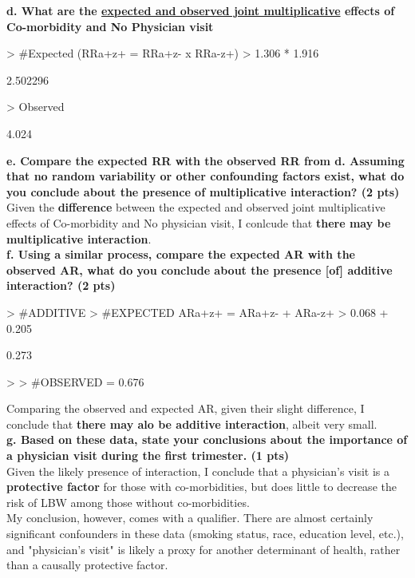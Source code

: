 \documentclass[12pt]{article}
\begin{document}
\noindent \textbf{d. What are the \underline{expected and observed joint multiplicative} effects of Co-morbidity and No Physician visit}

\begin{Schunk}
\begin{Sinput}
> #Expected (RRa+z+ = RRa+z- x RRa-z+)
> 1.306 * 1.916
\end{Sinput}
\begin{Soutput}
[1] 2.502296
\end{Soutput}
\begin{Sinput}
> Observed
\end{Sinput}
\begin{Soutput}
[1] 4.024
\end{Soutput}
\end{Schunk}

\noindent \textbf{e. Compare the expected RR with the observed RR from d.  Assuming that no random variability or other confounding factors exist, what do you conclude about the presence of multiplicative interaction? (2 pts)} \\

Given the \textbf{difference} between the expected and observed joint multiplicative effects of Co-morbidity and No physician visit, I conlcude that \textbf{there may be multiplicative interaction}. \\

\noindent \textbf{f. Using a similar process, compare the expected AR with the observed AR, what do you conclude about the presence [of] additive interaction? (2 pts)} \\

\begin{Schunk}
\begin{Sinput}
> #ADDITIVE
> #EXPECTED ARa+z+ = ARa+z- + ARa-z+
> 0.068 + 0.205
\end{Sinput}
\begin{Soutput}
[1] 0.273
\end{Soutput}
\begin{Sinput}
> 
> #OBSERVED = 0.676
\end{Sinput}
\end{Schunk}

Comparing the observed and expected AR, given their slight difference, I conclude that \textbf{there may alo be additive interaction}, albeit very small.\\

\noinent \textbf{g. Based on these data, state your conclusions about the importance of a physician visit during the first trimester. (1 pts)} \\

Given the likely presence of interaction, I conclude that a physician's visit is a \textbf{protective factor} for those with co-morbidities, but does little to decrease the risk of LBW among those without co-morbidities. \\

My conclusion, however, comes with a qualifier.  There are almost certainly significant confounders in these data (smoking status, race, education level, etc.), and "physician's visit" is likely a proxy for another determinant of health, rather than a causally protective factor.
\end{document}
